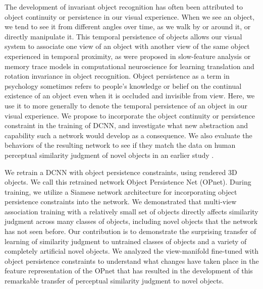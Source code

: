 \documentclass{article} %
\begin{document}
The development of invariant object recognition has often been attributed to  object continuity or persistence   in our visual experience. When we see an object, we tend to see it from different angles over time, as we walk by or around it, or directly manipulate it. This temporal persistence of objects allows our visual system to associate one view of an object with another view of the same object experienced in temporal proximity, as were proposed in slow-feature analysis \citep{Wiskott:2002ue} or memory trace models \citep{Perry:2006gl} in computational neuroscience for learning translation and rotation invariance in object recognition. Object persistence as a term in psychology sometimes refers to people's knowledge or belief on  the continual existence of an object even when it is occluded and invisible from view. Here, we use it to more generally to denote  the temporal persistence of an object in our visual experience. We propose to incorporate the object continuity or persistence constraint in the training of DCNN, and investigate what new abstraction and capability such a network would develop as a consequence. We also evaluate the behaviors of the resulting network to see if they match  the data on  human perceptual similarity judgment of novel objects in an earlier study \citep{tenenbaum2011grow}.  

We retrain a DCNN with object persistence constraints, using rendered 3D objects. We call this retrained network Object Persistence Net (OPnet). During training, we utilize a Siamese network architecture for incorporating object persistence constraints into the network. We demonstrated that multi-view association training with a relatively small set of objects directly affects similarity judgment across many classes of objects, including novel objects that the network has not seen before. Our contribution is to demonstrate the surprising transfer of learning of similarity judgment to untrained classes of objects and a variety of completely artificial novel objects.  We analyzed the view-manifold fine-tuned with object persistence constraints to understand what changes have taken place in the feature representation of the OPnet that has resulted in the development of this remarkable transfer of perceptual similarity judgment to novel objects.
\end{document}
